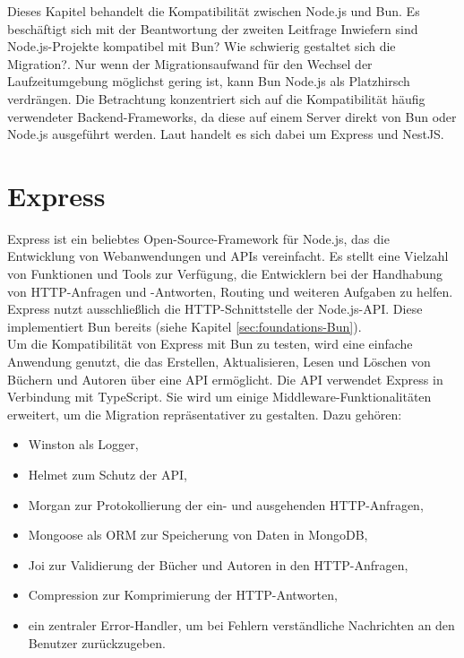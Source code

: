   \label{ch:compabitility}
Dieses Kapitel behandelt die Kompatibilität zwischen Node.js und Bun. Es beschäftigt sich mit der Beantwortung der zweiten Leitfrage \glqq Inwiefern sind Node.js-Projekte kompatibel mit Bun? Wie schwierig gestaltet sich die Migration?\grqq{}. Nur wenn der Migrationsaufwand für den Wechsel der Laufzeitumgebung möglichst gering ist, kann Bun Node.js als Platzhirsch verdrängen. Die Betrachtung konzentriert sich auf die Kompatibilität häufig verwendeter Backend-Frameworks, da diese auf einem Server direkt von Bun oder Node.js ausgeführt werden. Laut \cite{Greif.2022} handelt es sich dabei um Express und NestJS.

\section{Express} \label{sec:compabitility-express}
Express ist ein beliebtes Open-Source-Framework für Node.js, das die Entwicklung von Webanwendungen und APIs vereinfacht. Es stellt eine Vielzahl von Funktionen und Tools zur Verfügung, die Entwicklern bei der Handhabung von HTTP-Anfragen und -Antworten, Routing und weiteren Aufgaben zu helfen. Express nutzt ausschließlich die HTTP-Schnittstelle der Node.js-API. Diese implementiert Bun bereits (siehe Kapitel \ref{sec:foundations-Bun}).\cite{Brown.November2019}\\

\noindent 
Um die Kompatibilität von Express mit Bun zu testen, wird eine einfache Anwendung genutzt, die das Erstellen, Aktualisieren, Lesen und Löschen von Büchern und Autoren über eine API ermöglicht. Die API verwendet Express in Verbindung mit TypeScript. Sie wird um einige Middleware-Funktionalitäten erweitert, um die Migration repräsentativer zu gestalten. Dazu gehören:
\begin{itemize}
	\item Winston als Logger,
	\item Helmet zum Schutz der API,
	\item Morgan zur Protokollierung der ein- und ausgehenden HTTP-Anfragen,
	\item Mongoose als ORM zur Speicherung von Daten in MongoDB, 
	\item Joi zur Validierung der Bücher und Autoren in den HTTP-Anfragen,
	\item Compression zur Komprimierung der HTTP-Antworten,
	\item ein zentraler Error-Handler, um bei Fehlern verständliche Nachrichten an den Benutzer zurückzugeben.
\end{itemize}
	
